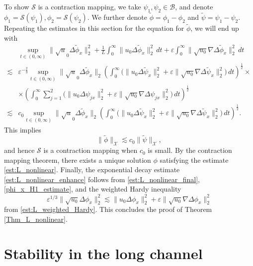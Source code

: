 \documentclass[reqno, 11pt]{amsart}
\theoremstyle{plain}
\theoremstyle{definition}
\theoremstyle{remark}
\numberwithin{equation}{section}
\newcommand\cB{\mathcal{B}}
\newcommand\cS{\mathcal{S}}
\newcommand\cX{\mathcal{X}}
\begin{document}
To show $\cS$ is a contraction mapping, we take $\psi_1, \psi_2 \in \cB$, and denote $\phi_1 = \cS(\psi_1), \phi_2 = \cS(\psi_2)$. We further denote $\widetilde{\phi} = \phi_1 - \phi_2$ and $\widetilde{\psi} = \psi_1 - \psi_2$. Repeating the estimates in this section for the equation for $\widetilde{\phi}$, we will end up with
\begin{align*}
&\sup_{t \in (0,\infty)} \|\sqrt u_0 \Delta \widetilde\phi_x\|_{2}^2 + \frac{1}{L} \int_0^\infty \| u_0 \Delta \widetilde\phi_x \|_{2}^2 \, dt + \varepsilon \int_0^\infty  \| \sqrt{u_0} \nabla \Delta \widetilde\phi_x \|_{2}^2 \, dt\\
\lesssim & \varepsilon^{-\frac{2}{3}} \sup_{t \in (0,\infty)} \|\sqrt u_0 \Delta \widetilde\phi_x\|_{2} \left( \int_0^\infty \Big( \|u_0 \Delta \widetilde\psi_x\|_2^2  +  \varepsilon \| \sqrt{u_0} \nabla \Delta \widetilde\psi_{x} \|_2^2 \Big) \, dt \right)^{\frac{1}{2}} \times\\
& \times \left( \int_0^\infty \sum_{j=1}^2 \Big( \|u_0 \Delta \psi_{jx}\|_2^2  +  \varepsilon \| \sqrt{u_0} \nabla \Delta \psi_{jx} \|_2^2 \Big) \, dt \right)^{\frac{1}{2}}\\
\lesssim & c_0 \sup_{t \in (0,\infty)} \|\sqrt u_0 \Delta \widetilde\phi_x\|_{2} \left( \int_0^\infty \Big( \|u_0 \Delta \widetilde\psi_x\|_2^2  +  \varepsilon \| \sqrt{u_0} \nabla \Delta \widetilde\psi_{x} \|_2^2 \Big) \, dt \right)^{\frac{1}{2}}.
\end{align*}
This implies 
$$
\| \widetilde \phi\|_{\cX} \lesssim c_0 \| \widetilde \psi\|_{\cX},
$$
and hence $\cS$ is a contraction mapping when $c_0$ is small. By the contraction mapping theorem, there exists a unique solution $\phi$ satisfying the estimate \eqref{est:L_nonlinear}. Finally, the exponential decay estimate \eqref{est:L_nonlinear_enhance} follows from \eqref{est:L_nonlinear_final}, \eqref{phi_x_H1_estimate}, and the weighted Hardy inequality
$$
\varepsilon^{1/3} \|\sqrt{u_0} \Delta \phi_x\|_2^2 \lesssim \|u_0 \Delta \phi_x\|_2^2 + \varepsilon \| \sqrt{u_0} \nabla \Delta \phi_x \|_2^2
$$
from \eqref{est:L_weighted_Hardy}. This concludes the proof of Theorem \ref{Thm_L_nonlinear}.




\section{Stability in the long channel}\label{sec:stability_long}
\end{document}
